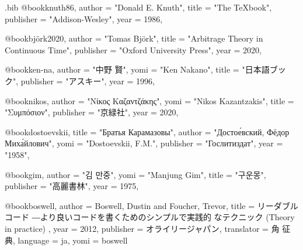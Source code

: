 
\begin{filecontents}[overwrite]{\jobname.bib}
@book{knuth86,
  author    = "Donald E. Knuth",
  title     = "The \TeX book",
  publisher = "Addison-Wesley",
  year      = 1986,
}

@book{björk2020,
  author    = "Tomas Björk",
  title     = "Arbitrage Theory in Continuous Time",
  publisher = "Oxford University Press",
  year      = 2020,
}

@book{ken-na,
  author    = "中野 賢",
  yomi      = "Ken Nakano",
  title     = "日本語{\LaTeXe}ブック",
  publisher = "アスキー",
  year      = 1996,
}

@book{nikos,
  author    = "Νίκος Καζαντζάκης",
  yomi      = "Nikos Kazantzakis",
  title     = "Συμπόσιον",
  publisher = "京緑社",
  year      = 2020,
}

@book{dostoevskii,
  title     = "Братья Карамазовы",
  author    = "Достое́вский, Фёдор Миха́йлович",
  yomi      = "Dostoevskii, F.M.",
  publisher = "Гослитиздат",
  year      = "1958",
}

@book{gim,
  author    = "김 만중",
  yomi      = "Manjung Gim",
  title     = "구운몽",
  publisher = "高麗書林",
  year      = 1975,
}

@book{boswell,
  author     = {Boswell, Dustin and Foucher, Trevor},
  title      = {リーダブルコード ―より良いコードを書くためのシンプルで実践的
                なテクニック (Theory in practice) },
  year       = 2012,
  publisher  = {オライリージャパン},
  translator = {角 征典},
  language   = {ja},
  yomi       = {boswell}
}
\end{filecontents}

\documentclass{ltjsarticle}
\usepackage{luatexja-fontspec}
\usepackage[sourcehan]{luatexja-preset}
\setmainfont{XITS}%

test
\nocite{*}



